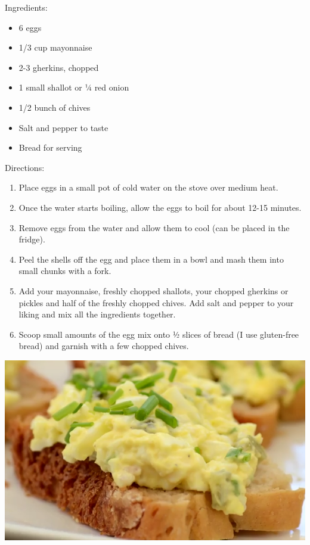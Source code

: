 \documentclass{article}
\begin{document}
%
%
%
%
%

\begin{multicols}{2}
Ingredients:
\begin{itemize}
\item 6 eggs
\item 1/3 cup mayonnaise
\item 2-3 gherkins, chopped
\item 1 small shallot or ¼ red onion
\item 1/2 bunch of chives
\item Salt and pepper to taste
\item Bread for serving
\end{itemize}

\columnbreak

Directions:
\begin{enumerate}
\item Place eggs in a small pot of cold water on the stove over medium heat.

\item Once the water starts boiling, allow the eggs to boil for about 12-15 minutes.

\item Remove eggs from the water and allow them to cool (can be placed in the fridge).

\item Peel the shells off the egg and place them in a bowl and mash them into small chunks with a fork.

\item Add your mayonnaise, freshly chopped shallots, your chopped gherkins or pickles and half of the freshly chopped chives. Add salt and pepper to your liking and mix all the ingredients together.

\item Scoop small amounts of the egg mix onto ½ slices of bread (I use gluten-free bread) and garnish with a few chopped chives.

\end{enumerate}
\end{multicols}



\begin{center}
\includegraphics[scale=0.4]{EggSandwiches.png}
\end{center}
\end{document}
